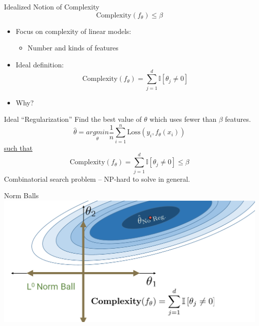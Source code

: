 \documentclass[aspectratio=169]{../latex_main/tntbeamer}  %
\begin{document}
	
	\begin{frame}[c]{Idealized Notion of Complexity}
	   \begin{equation*}
	         \text{Complexity}(f_\theta) \leq \beta
	    \end{equation*}
        \begin{itemize}
            \item Focus on complexity of linear models:
            \begin{itemize}
                \item Number and kinds of features
            \end{itemize}
            \item Ideal definition:
            \begin{equation*}
                \text{Complexity}(f_\theta) = \sum\limits_{j=1}^d\mathbb{I}[\theta_j \neq 0] 
            \end{equation*}
            \item Why?
        \end{itemize}
	\end{frame}
	
	
	\begin{frame}[c]{Ideal “Regularization”}
	Find the best value of $\theta$ which uses fewer than $\beta$ features.
	  \begin{equation*}
	        \hat{\theta} = \underset{\theta}{arg min} \frac{1}{n}\sum\limits_{i=1}^n\text{Loss}(y_i,f_\theta(x_i))
	    \end{equation*}
	    \underline{such that}
	    \begin{equation*}
                \text{Complexity}(f_\theta) = \sum\limits_{j=1}^d\mathbb{I}[\theta_j \neq 0] \leq \beta
        \end{equation*}
        Combinatorial search problem – NP-hard to solve in general.

	\end{frame}
	
	
	\begin{frame}{Norm Balls}
	    \includegraphics[scale=.35]{Bild5}
	\end{frame}
	
\end{document}
